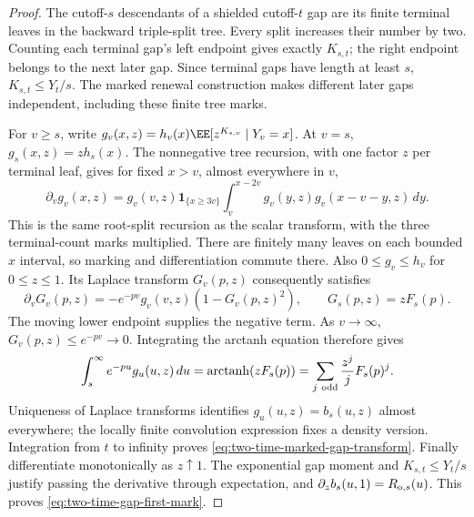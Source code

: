 \documentclass[11pt,letterpaper]{article}
\newcommand{\ind}{\mathbf 1}\newcommand{\Exp}{\operatorname{Exp}}
\begin{document}
\begin{proof}
The cutoff-$s$ descendants of a shielded cutoff-$t$ gap are
its finite terminal leaves in the backward triple-split tree.
Every split increases their number by two. Counting each
terminal gap's left endpoint gives exactly $K_{s,t}$; the
right endpoint belongs to the next later gap. Since terminal
gaps have length at least $s$, $K_{s,t}\le Y_t/s$.
The marked renewal construction makes different later gaps
independent, including these finite tree marks.

For $v\ge s$, write
$g_v(x,z)=h_v(x)\EE[z^{K_{s,v}}\mid Y_v=x]$.
At $v=s$, $g_s(x,z)=z h_s(x)$.
The nonnegative tree recursion, with one factor $z$ per terminal
leaf, gives for fixed $x>v$, almost everywhere in $v$,
\[
 \partial_v g_v(x,z)
   =g_v(v,z)\ind_{\{x\ge3v\}}
          \int_v^{x-2v}g_v(y,z)g_v(x-v-y,z)\,dy.
\]
This is the same root-split recursion as the scalar transform,
with the three terminal-count marks multiplied. There are
finitely many leaves on each bounded $x$ interval, so marking
and differentiation commute there. Also $0\le g_v\le h_v$ for
$0\le z\le1$. Its Laplace transform $G_v(p,z)$ consequently
satisfies
\[
 \partial_v G_v(p,z)
       =-e^{-pv}g_v(v,z)(1-G_v(p,z)^2),
 \qquad G_s(p,z)=zF_s(p).
\]
The moving lower endpoint supplies the negative term.
As $v\to\infty$, $G_v(p,z)\le e^{-pv}\to0$.
Integrating the arctanh equation therefore gives
\[
 \int_s^\infty e^{-pu}g_u(u,z)\,du
          =\operatorname{arctanh}(zF_s(p))
          =\sum_{j\ {\rm odd}}\frac{z^j}{j}F_s(p)^j.
\]
Uniqueness of Laplace transforms identifies
$g_u(u,z)=b_s(u,z)$ almost everywhere; the locally finite
convolution expression fixes a density version. Integration
from $t$ to infinity proves
\eqref{eq:two-time-marked-gap-transform}.
Finally differentiate monotonically as $z\uparrow1$.
The exponential gap moment and $K_{s,t}\le Y_t/s$ justify
passing the derivative through expectation, and
$\partial_z b_s(u,1)=R_{{\rm o},s}(u)$.
This proves \eqref{eq:two-time-gap-first-mark}.
\end{proof}
\end{document}
